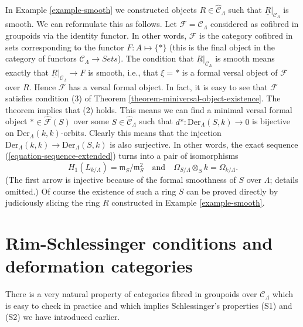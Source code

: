 \begin{example}
\label{example-smooth-continued}
In
Example \ref{example-smooth}
we constructed objects $R \in \widehat{\mathcal{C}}_\Lambda$ such that
$\underline{R}|_{\mathcal{C}_\Lambda}$ is smooth. We can reformulate
this as follows. Let $\mathcal{F} = \mathcal{C}_\Lambda$ considered
as cofibred in groupoids via the identity functor. In other words,
$\mathcal{F}$ is the category cofibred in sets corresponding to
the functor $F : A \mapsto \{*\}$ (this is the final object in the
category of functors $\mathcal{C}_\Lambda \to \textit{Sets}$).
The condition that $\underline{R}|_{\mathcal{C}_\Lambda}$ is smooth
means exactly that $\underline{R}|_{\mathcal{C}_\Lambda} \to F$
is smooth, i.e., that $\xi = *$ is a formal versal object of $\mathcal{F}$
over $R$. Hence $\mathcal{F}$ has a versal formal object.
In fact, it is easy to see that $\mathcal{F}$ satisfies condition (3) of
Theorem \ref{theorem-miniversal-object-existence}.
The theorem implies that (2) holds. This means
we can find a minimal versal formal object $* \in \widehat{\mathcal{F}}(S)$
over some $S \in \widehat{\mathcal{C}}_\Lambda$ such that
$d* : \text{Der}_\Lambda(S, k) \to 0$ is bijective on
$\text{Der}_\Lambda(k, k)$-orbits. Clearly this means that the injection
$\text{Der}_\Lambda(k, k) \to \text{Der}_\Lambda(S, k)$ is also surjective.
In other words, the exact sequence (\ref{equation-sequence-extended})
turns into a pair of isomorphisms
$$
H_1(L_{k/\Lambda}) = \mathfrak m_S/\mathfrak m_S^2
\quad\text{and}\quad
\Omega_{S/\Lambda} \otimes_S k = \Omega_{k/\Lambda}.
$$
(The first arrow is injective because of the formal smoothness of
$S$ over $\Lambda$; details omitted.) Of course the existence of such
a ring $S$ can be proved directly by judiciously slicing the ring
$R$ constructed in
Example \ref{example-smooth}.
\end{example}







\section{Rim-Schlessinger conditions and deformation categories}
\label{section-RS-condition}

\noindent
There is a very natural property of categories fibred in groupoids
over $\mathcal{C}_\Lambda$ which is easy to check in practice
and which implies Schlessinger's properties (S1) and (S2) we
have introduced earlier.

